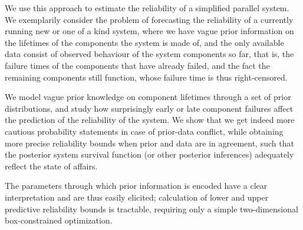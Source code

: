 \documentclass[12pt,a4paper,twocolumn,fleqn]{narmsabs}
\begin{document}
We use this approach to estimate the reliability of a simplified parallel system.
We exemplarily consider the problem of forecasting the reliability of a currently running new or one of a kind system,
where we have vague prior information on the lifetimes of the components the system is made of,
and the only available data consist of observed behaviour of the system components so far,
that is, the failure times of the components that have already failed,
and the fact the remaining components still function,
whose failure time is thus right-censored.

We model vague prior knowledge on component lifetimes through a set of prior distributions,
and study how surprisingly early or late component failures
affect the prediction of the reliability of the system.
We show that we get indeed more cautious probability statements in case of prior-data conflict,
while obtaining more precise reliability bounds when prior and data are in agreement,
such that the posterior system survival function (or other posterior inferences)
adequately reflect the state of affairs.

The parameters through which prior information is encoded have a clear interpretation
and are thus easily elicited;
calculation of lower and upper predictive reliability bounds is tractable,
requiring only a simple two-dimensional box-constrained optimization.




\end{document}
